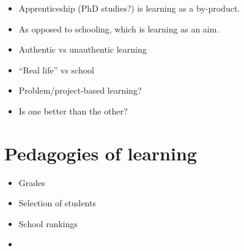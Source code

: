 \begin{frame}
  \begin{example}
    \begin{itemize}
      \item Apprenticeship (PhD studies?) is learning as a by-product.
      \item As opposed to schooling, which is learning as an aim.
    \end{itemize}
  \end{example}

  \pause

  \begin{example}
    \begin{itemize}
      \item Authentic vs unauthentic learning
      \item \enquote{Real life} vs school
      \item Problem/project-based learning?
    \end{itemize}
  \end{example}

  \pause

  \begin{question}
    \begin{itemize}
      \item Is one better than the other?
    \end{itemize}
  \end{question}
\end{frame}


\section{Pedagogies of learning}

\begin{frame}
  \begin{remark}[Institutionalization]
    \begin{itemize}
      \item Grades
      \item Selection of students
      \item School rankings
      \item \etc
    \end{itemize}
  \end{remark}
\end{frame}

